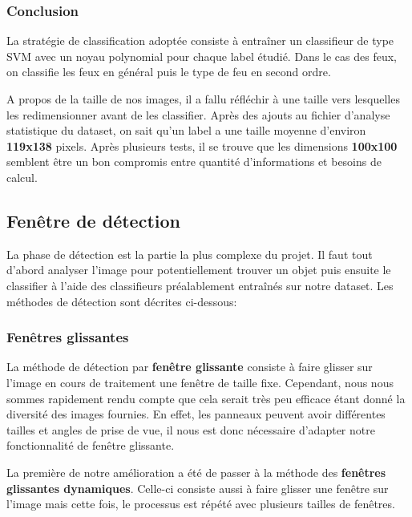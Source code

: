 \documentclass[a4paper,11pt]{article}
\begin{document}
\subsubsection{Conclusion}

La stratégie de classification adoptée consiste à entraîner un classifieur de type SVM avec un noyau polynomial pour chaque label étudié. Dans le cas des feux, on classifie les feux en général puis le type de feu en second ordre.

\vspace{2mm}

\noindent A propos de la taille de nos images, il a fallu réfléchir à une taille vers lesquelles les redimensionner avant de les classifier. Après des ajouts au fichier d'analyse statistique du dataset, on sait qu'un label a une taille moyenne d'environ \textbf{119x138} pixels. Après plusieurs tests, il se trouve que les dimensions \textbf{100x100} semblent être un bon compromis entre quantité d'informations et besoins de calcul.

\subsection{Fenêtre de détection}
La phase de détection est la partie la plus complexe du projet. Il faut tout d'abord analyser l'image pour potentiellement trouver un objet puis ensuite le classifier à l'aide des classifieurs préalablement entraînés sur notre dataset. Les méthodes de détection sont décrites ci-dessous:

\subsubsection{Fenêtres glissantes}

La méthode de détection par \textbf{fenêtre glissante} consiste à faire glisser sur l'image en cours de traitement une fenêtre de taille fixe. Cependant, nous nous sommes rapidement rendu compte que cela serait très peu efficace étant donné la diversité des images fournies. En effet, les panneaux peuvent avoir différentes tailles et angles de prise de vue, il nous est donc nécessaire d'adapter notre fonctionnalité de fenêtre glissante. 

\vspace{2mm}

\noindent La première de notre amélioration a été de passer à la méthode des \textbf{fenêtres glissantes dynamiques}. Celle-ci consiste aussi à faire glisser une fenêtre sur l'image mais cette fois, le processus est répété avec plusieurs tailles de fenêtres.
\end{document}
